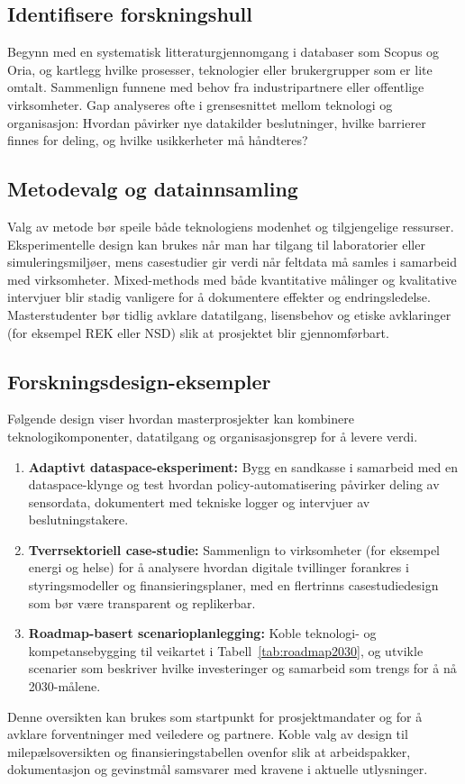 \subsection{Identifisere forskningshull}
Begynn med en systematisk litteraturgjennomgang i databaser som Scopus og Oria, og kartlegg hvilke prosesser, teknologier eller brukergrupper som er lite omtalt. Sammenlign funnene med behov fra industripartnere eller offentlige virksomheter. Gap analyseres ofte i grensesnittet mellom teknologi og organisasjon: Hvordan påvirker nye datakilder beslutninger, hvilke barrierer finnes for deling, og hvilke usikkerheter må håndteres?

\subsection{Metodevalg og datainnsamling}
Valg av metode bør speile både teknologiens modenhet og tilgjengelige ressurser. Eksperimentelle design kan brukes når man har tilgang til laboratorier eller simuleringsmiljøer, mens casestudier gir verdi når feltdata må samles i samarbeid med virksomheter. Mixed-methods med både kvantitative målinger og kvalitative intervjuer blir stadig vanligere for å dokumentere effekter og endringsledelse. Masterstudenter bør tidlig avklare datatilgang, lisensbehov og etiske avklaringer (for eksempel REK eller NSD) slik at prosjektet blir gjennomførbart.

\subsection{Forskningsdesign-eksempler}
Følgende design viser hvordan masterprosjekter kan kombinere teknologikomponenter, datatilgang og organisasjonsgrep for å levere verdi.
\begin{enumerate}
    \item \textbf{Adaptivt dataspace-eksperiment:} Bygg en sandkasse i samarbeid med en dataspace-klynge og test hvordan policy-automatisering påvirker deling av sensordata, dokumentert med tekniske logger og intervjuer av beslutningstakere.\citep{idsa2023ram,rcn2024programkatalog}
    \item \textbf{Tverrsektoriell case-studie:} Sammenlign to virksomheter (for eksempel energi og helse) for å analysere hvordan digitale tvillinger forankres i styringsmodeller og finansieringsplaner, med en flertrinns casestudiedesign som bør være transparent og replikerbar.\citep{yin2018case}
    \item \textbf{Roadmap-basert scenarioplanlegging:} Koble teknologi- og kompetansebygging til veikartet i Tabell~\ref{tab:roadmap2030}, og utvikle scenarier som beskriver hvilke investeringer og samarbeid som trengs for å nå 2030-målene.\citep{rcn2023veikart}
\end{enumerate}
Denne oversikten kan brukes som startpunkt for prosjektmandater og for å avklare forventninger med veiledere og partnere. Koble valg av design til milepælsoversikten og finansieringstabellen ovenfor slik at arbeidspakker, dokumentasjon og gevinstmål samsvarer med kravene i aktuelle utlysninger.\citep{rcn2024digitalisering}

